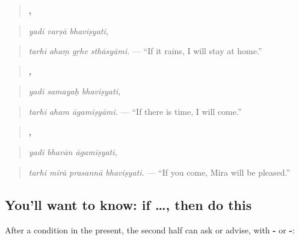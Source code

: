 \begin{quote}
\textbf{  ,}
\end{quote}

\begin{quote}
\emph{yadi varṣā bhaviṣyati,}
\end{quote}

\begin{quote}
\textbf{   }
\end{quote}

\begin{quote}
\emph{tarhi ahaṃ gṛhe sthāsyāmi.} — \textquotedblleft{}If it rains, I will stay at home.\textquotedblright{}
\end{quote}

\begin{quote}
\textbf{  ,}
\end{quote}

\begin{quote}
\emph{yadi samayaḥ bhaviṣyati,}
\end{quote}

\begin{quote}
\textbf{  }
\end{quote}

\begin{quote}
\emph{tarhi aham āgamiṣyāmi.} — \textquotedblleft{}If there is time, I will come.\textquotedblright{}
\end{quote}

\begin{quote}
\textbf{  ,}
\end{quote}

\begin{quote}
\emph{yadi bhavān āgamiṣyati,}
\end{quote}

\begin{quote}
\textbf{   }
\end{quote}

\begin{quote}
\emph{tarhi mīrā prasannā bhaviṣyati.} — \textquotedblleft{}If you come, Mira will be pleased.\textquotedblright{}
\end{quote}

\subsection*{You'll want to know: if …, then do this}
After a condition in the present, the second half can ask or advise, with \textbf{-} or \textbf{-}:

